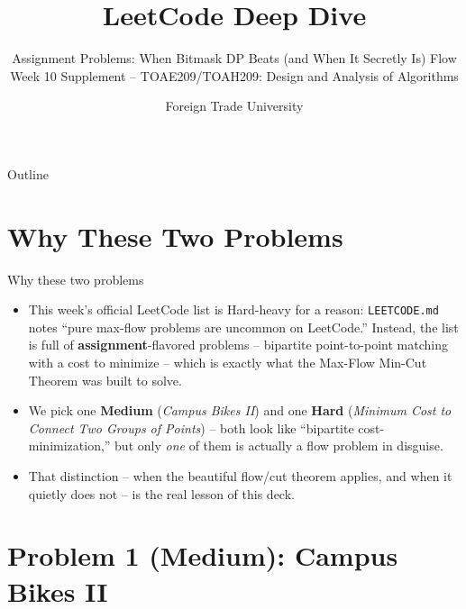 \documentclass[11pt,aspectratio=169]{beamer}
\title{LeetCode Deep Dive}
\subtitle{Assignment Problems: When Bitmask DP Beats (and When It Secretly Is) Flow\\
\small Week 10 Supplement -- TOAE209/TOAH209: Design and Analysis of Algorithms}
\author{Foreign Trade University}
\date{}
\begin{document}
\begin{frame}
  \titlepage
\end{frame}

\begin{frame}{Outline}
  \tableofcontents
\end{frame}

\section{Why These Two Problems}

\begin{frame}{Why these two problems}
  \begin{itemize}
    \item This week's official LeetCode list is Hard-heavy for a reason:
    \texttt{LEETCODE.md} notes ``pure max-flow problems are uncommon on LeetCode.''
    Instead, the list is full of \textbf{assignment}-flavored problems -- bipartite
    point-to-point matching with a cost to minimize -- which is exactly what the
    Max-Flow Min-Cut Theorem was built to solve.
    \item We pick one \textcolor{blue!50!black}{\textbf{Medium}} (\emph{Campus Bikes
    II}) and one \textcolor{red!60!black}{\textbf{Hard}} (\emph{Minimum Cost to Connect
    Two Groups of Points}) -- both look like ``bipartite cost-minimization,'' but only
    \emph{one} of them is actually a flow problem in disguise.
    \item That distinction -- when the beautiful flow/cut theorem applies, and when it
    quietly does not -- is the real lesson of this deck.
  \end{itemize}
\end{frame}

\section{Problem 1 (Medium): Campus Bikes II}
\end{document}

